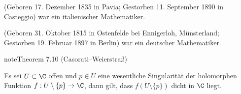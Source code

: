 \documentclass[letterpaper,10pt,german]{jupyterBook}
\begin{document}
\begin{sphinxShadowBox}

\sphinxAtStartPar
{} (Geboren 17. Dezember 1835 in Pavia; Gestorben 11. September 1890 in Casteggio) war ein italienischer Mathematiker.
\end{sphinxShadowBox}

\begin{sphinxShadowBox}

\sphinxAtStartPar
{} (Geboren 31. Oktober 1815 in Ostenfelde bei Ennigerloh, Münsterland; Gestorben 19. Februar 1897 in Berlin) war ein deutscher Mathematiker.
\end{sphinxShadowBox}
\label{complexanalysis/residuensatz:theorem-7}
\begin{sphinxadmonition}{note}{Theorem 7.10 (Casorati–Weierstraß)}



\sphinxAtStartPar
Es sei \(U \subset \C\) offen und \(p\in U\) eine wesentliche Singularität der holomorphen Funktion \(f:U\setminus\{p\}\to\C\), dann gilt, dass \(f(U\setminus\{p\})\) dicht in \(\C\) liegt.
\end{sphinxadmonition}
\end{document}
